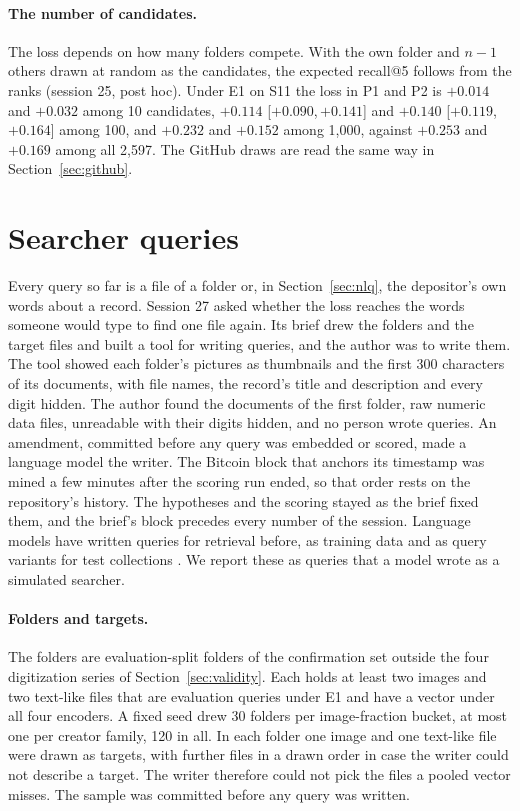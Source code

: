 \documentclass[11pt]{article}
\newcommand{\ci}[2]{[\ensuremath{#1},\,\ensuremath{#2}]}  %
\begin{document}
\paragraph{The number of candidates.} The loss depends on how many folders compete. With the own folder and $n - 1$ others drawn at random as the candidates, the expected recall@5 follows from the ranks (session 25, post hoc). Under E1 on S11 the loss in P1 and P2 is $+0.014$ and $+0.032$ among 10 candidates, $+0.114$ \ci{+0.090}{+0.141} and $+0.140$ \ci{+0.119}{+0.164} among 100, and $+0.232$ and $+0.152$ among 1,000, against $+0.253$ and $+0.169$ among all 2,597. The GitHub draws are read the same way in Section~\ref{sec:github}.

\section{Searcher queries}
\label{sec:searcher}

Every query so far is a file of a folder or, in Section~\ref{sec:nlq}, the depositor's own words about a record. Session 27 asked whether the loss reaches the words someone would type to find one file again. Its brief drew the folders and the target files and built a tool for writing queries, and the author was to write them. The tool showed each folder's pictures as thumbnails and the first 300 characters of its documents, with file names, the record's title and description and every digit hidden. The author found the documents of the first folder, raw numeric data files, unreadable with their digits hidden, and no person wrote queries. An amendment, committed before any query was embedded or scored, made a language model the writer. The Bitcoin block that anchors its timestamp was mined a few minutes after the scoring run ended, so that order rests on the repository's history. The hypotheses and the scoring stayed as the brief fixed them, and the brief's block precedes every number of the session. Language models have written queries for retrieval before, as training data \citep{bonifacio2022inpars} and as query variants for test collections \citep{alaofi2023variants}. We report these as queries that a model wrote as a simulated searcher.

\paragraph{Folders and targets.} The folders are evaluation-split folders of the confirmation set outside the four digitization series of Section~\ref{sec:validity}. Each holds at least two images and two text-like files that are evaluation queries under E1 and have a vector under all four encoders. A fixed seed drew 30 folders per image-fraction bucket, at most one per creator family, 120 in all. In each folder one image and one text-like file were drawn as targets, with further files in a drawn order in case the writer could not describe a target. The writer therefore could not pick the files a pooled vector misses. The sample was committed before any query was written.
\end{document}
